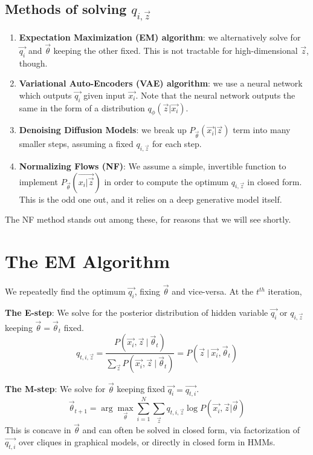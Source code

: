 \documentclass[a4paper]{article}
\begin{document}
\subsection{Methods of solving $q_{i, \vec{z}}$} \begin{enumerate}
    \item \textbf{Expectation Maximization (EM) algorithm}: we alternatively solve for $\vec{q_{i}}$ and $\vec{\theta}$ keeping the other fixed. This is not tractable for high-dimensional $\vec{z}$, though.
    
    \item \textbf{Variational Auto-Encoders (VAE) algorithm}: we use a neural network which outputs $\vec{q_i}$ given input $\vec{x_i}$. Note that the neural network outputs the same in the form of a distribution $q_{\phi}(\vec{z} | \vec{x_i} )$.

    \item \textbf{Denoising Diffusion Models}: we break up $P_{\vec{\theta}}(\vec{x_i} | \vec{z}) $ term into many smaller steps, assuming a fixed $q_{i, \vec{z}}$ for each step.

    \item \textbf{Normalizing Flows (NF)}: We assume a simple, invertible function to implement $P_{\vec{\theta}}(\vec{x_i | \vec{z}})$ in order to compute the optimum $q_{i, \vec{z}} $ in closed form. This is the odd one out, and it relies on a deep generative model itself. 
\end{enumerate}
The NF method stands out among these, for reasons that we will see shortly. 

\section{The EM Algorithm}
We repeatedly find the optimum $\vec{q_i}$, fixing $\vec{\theta}$ and vice-versa. At the $t^{th}$ iteration,

\textbf{The E-step}: We solve for the posterior distribution of hidden variable $\vec{q_{i}}$ or $q_{i, \vec{z}}$ keeping $\vec{\theta} = \vec{\theta}_t$ fixed. \[
q_{t, i, \vec{z}} = \frac{P(\vec{x_i}, \vec{z}\ |\ \vec{\theta}_t)}{\sum_{\vec{z}} P(\vec{x_i}, \vec{z}\ |\ \vec{\theta}_t)} = P(\vec{z}\ |\ \vec{x_i}, \vec{\theta}_t) 
\]

\textbf{The M-step}: We solve for $\vec{\theta}$ keeping fixed $\vec{q_i} = \vec{q_{t, i}}$. \[
\vec{\theta}_{t + 1} = \arg\max_{\vec{\theta}}\sum_{i = 1}^{N} \sum_{\vec{z}} 
q_{t, i, \vec{z}} \log P(\vec{x_i}, \vec{z} | \vec{\theta})
\] This is concave in $\vec{\theta}$ and can often be solved in closed form, via factorization of $\vec{q_{t, i}}$ over cliques in graphical models, or directly in closed form in HMMs.
\hfill \\
\end{document}
